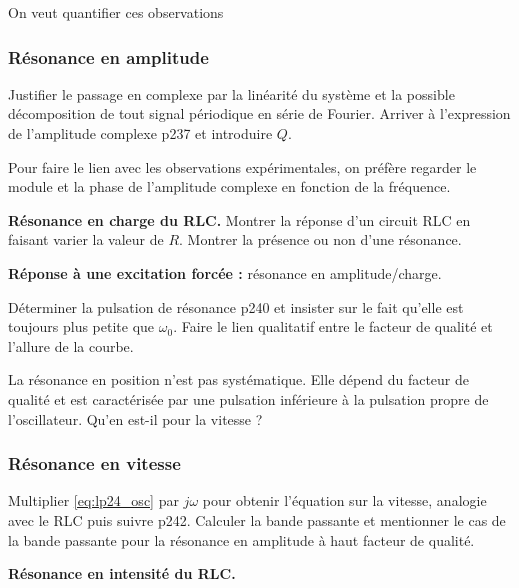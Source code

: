 \begin{transition}
On veut quantifier ces observations
\end{transition}

\subsubsection{Résonance en amplitude}

Justifier le passage en complexe par la linéarité du système et la possible décomposition de tout signal périodique en série de Fourier.
Arriver à l'expression de l'amplitude complexe \cite{Michel2017} p237 et introduire $Q$.

Pour faire le lien avec les observations expérimentales, on préfère regarder le module et la phase de l'amplitude complexe en fonction de la fréquence.

\begin{experience}
\textbf{Résonance en charge du RLC.}
Montrer la réponse d'un circuit RLC en faisant varier la valeur de $R$. Montrer la présence ou non d'une résonance.
\end{experience}

\begin{slide}
\textbf{Réponse à une excitation forcée :} résonance en amplitude/charge.
\end{slide}

Déterminer la pulsation de résonance \cite{Michel2017} p240 et insister sur le fait qu'elle est toujours plus petite que $\omega_0$.
Faire le lien qualitatif entre le facteur de qualité et l'allure de la courbe.

\begin{transition}
La résonance en position n'est pas systématique.
Elle dépend du facteur de qualité et est caractérisée par une pulsation inférieure à la pulsation propre de l'oscillateur.
Qu'en est-il pour la vitesse ?
\end{transition}

\subsubsection{Résonance en vitesse}

Multiplier \eqref{eq:lp24_osc} par $j\omega$ pour obtenir l'équation sur la vitesse, analogie avec le RLC puis suivre \cite{Michel2017} p242.
Calculer la bande passante et mentionner le cas de la bande passante pour la résonance en amplitude à haut facteur de qualité.

\begin{experience}
\textbf{Résonance en intensité du RLC.}
\end{experience}

